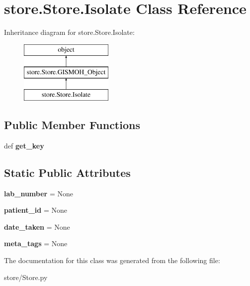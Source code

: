 \hypertarget{classstore_1_1_store_1_1_isolate}{\section{store.\-Store.\-Isolate Class Reference}
\label{classstore_1_1_store_1_1_isolate}
}
Inheritance diagram for store.\-Store.\-Isolate\-:\begin{figure}[H]
\begin{center}
\leavevmode
\includegraphics[height=3.000000cm]{classstore_1_1_store_1_1_isolate}
\end{center}
\end{figure}
\subsection*{Public Member Functions}
\begin{DoxyCompactItemize}
\item 
\hypertarget{classstore_1_1_store_1_1_isolate_a5c16cc9d4271954b3ac7b15a1825e282}{def {\bfseries get\-\_\-key}}\label{classstore_1_1_store_1_1_isolate_a5c16cc9d4271954b3ac7b15a1825e282}

\end{DoxyCompactItemize}
\subsection*{Static Public Attributes}
\begin{DoxyCompactItemize}
\item 
\hypertarget{classstore_1_1_store_1_1_isolate_ab6c42ec02ecd9a44732058c4aae265c9}{{\bfseries lab\-\_\-number} = None}\label{classstore_1_1_store_1_1_isolate_ab6c42ec02ecd9a44732058c4aae265c9}

\item 
\hypertarget{classstore_1_1_store_1_1_isolate_ae75afdb7ee3b0064c954d04137a780e8}{{\bfseries patient\-\_\-id} = None}\label{classstore_1_1_store_1_1_isolate_ae75afdb7ee3b0064c954d04137a780e8}

\item 
\hypertarget{classstore_1_1_store_1_1_isolate_aeb1865270e2f3c91a369dfe3ee623e48}{{\bfseries date\-\_\-taken} = None}\label{classstore_1_1_store_1_1_isolate_aeb1865270e2f3c91a369dfe3ee623e48}

\item 
\hypertarget{classstore_1_1_store_1_1_isolate_a7b8b6b0088488d655bf0c0eba25f22ba}{{\bfseries meta\-\_\-tags} = None}\label{classstore_1_1_store_1_1_isolate_a7b8b6b0088488d655bf0c0eba25f22ba}

\end{DoxyCompactItemize}


The documentation for this class was generated from the following file\-:\begin{DoxyCompactItemize}
\item 
store/Store.\-py\end{DoxyCompactItemize}
